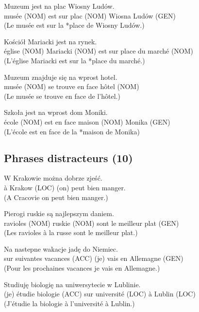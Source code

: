 \documentclass[output=paper]{langscibook}
\begin{document}
\begin{otherlanguage}{french}
\begin{paperappendix}
\begin{exe}
\gll Muzeum     jest   na   plac     Wiosny Ludów.\\
    {musée (NOM)} est   sur   {plac (NOM)}   {Wiosna} Ludów (GEN)\\
\glt (Le musée est sur la *place de Wiosny Ludów.)

\gll Kościół     Mariacki     jest   na   rynek.\\
      {église (NOM)}   {Mariacki (NOM)}   est   sur   {place du marché (NOM)}\\
\glt (L’église Mariacki est sur la *place du marché.)

\gll Muzeum     znajduje się   na wprost   hotel.\\
      {musée (NOM)} se trouve   en face     {hôtel (NOM)}\\
\glt (Le musée se trouve en face de l’hôtel.)

\gll Szkoła     jest   na wprost   dom     Moniki.\\
      {école (NOM)} est   en face     {maison (NOM)}   {Monika (GEN)}\\
\glt (L’école est en face de la *maison de Monika)
\end{exe}

\subsection{Phrases distracteurs (10)}

\begin{exe}
\gll W   Krakowie     można     dobrze     zjeść.\\
      à   {Krakow (LOC)}     {(on) peut}   bien     manger.\\
\glt (A Cracovie on peut bien manger.)

\gll Pierogi     ruskie       są   najlepszym   daniem.\\
      {ravioles (NOM)}   {ruskie (NOM)}     sont   {le meilleur}   {plat (GEN)}\\
\glt (Les ravioles à la russe sont le meilleur plat.)

\gll Na     nastepne   wakacje    {} jadę     do   Niemiec.\\
      sur     suivantes   {vacances (ACC)} (je) vais en   {Allemagne (GEN)}\\
\glt (Pour les prochaines vacances je vais en Allemagne.)

\gll Studiuję   biologię     na   uniwersytecie     w   Lublinie.\\
      {(je) étudie}   {biologie (ACC)}     sur   {université (LOC)}   à   {Lublin (LOC)}\\
\glt (J’étudie la biologie à l’université à Lublin.)


\end{exe}
\end{paperappendix}
\end{otherlanguage}
\end{document}
